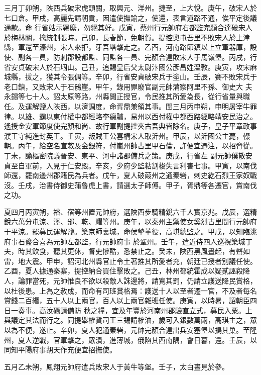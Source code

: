 \begin{pinyinscope}
 三月丁卯朔，陜西兵破宋虎頭關，取興元、洋州。捷至，上大悅。庚午，破宋人於七口倉。甲戌，高麗先請朝貢，因遣使撫諭之，使還，表言道路不通，俟平定後議通款。命
 行省姑示羈縻，勿絕其好。戊寅，蔡州行元帥府右都監完顏合達破宋人於梅林關，擒統制張時。己卯，長春節，免朝賀。提控奧屯吾里不敗宋人於上津縣，軍還至濠州，宋人來拒，牙吾塔擊走之。乙酉，河南路節鎮以上立軍器庫，設使、副各一員，防刺郡設都監、同監各一員、完顏合達敗宋人于馬嶺堡。丙戌，行省安貞破宋人於石堌山。己丑，追賜皇后父太尉汴國公彥昌姓溫敦。庚寅，攻宋麻城縣，拔之，獲其令張倜等。辛卯，行省安貞破宋兵于塗山。壬辰，賽不敗宋兵于老口鎮，又敗宋人于石鶻崖。甲午，錄用罪廢官副元帥蒲察阿里不孫、御史大
 夫永錫等七十人。詔太原等路，州縣闕正授官，令民推其所愛為長，從行省量與職任。及運解鹽人陜西，以濟調度，命胥鼎兼領其事。閏三月丙申朔，申明屠宰牛罪律。以雄、霸以東付權中都經略李瘸驢，易州以西付權中都西路經略靖安民治之。遙授金安軍節度使完顏和尚、故行軍副提控夾古吾典皆除名。庚子，皇子平章政事濮王守純進封英王。壬寅，叛賊王公喜構宋人取沂州。甲辰，以沂國公主薨，輟朝。丙午，給空名宣敕及金銀符，付嵐州帥古里甲石倫，許便宜遷注，以招脅從。丁未，諭樞密院議晉安、東平、河中諸郡備兵之策。庚戌，行省左
 副元帥僕散安貞至自軍前，入見于仁安殿。辛亥，少府少監粘割梭失言利害七事。甲寅，以南伐師還，罷南邊州郡籍民為兵者。戊午，夏人破葭州之通秦砦，刺史紇石烈王家奴戰沒。壬戌，治書侍御史蒲魯虎上書，請選太子師傅。甲子，胥鼎等各遷官，賞南伐之功。



 夏四月丙寅朔，裕、宿等州置元帥府，選陜西步騎精銳六千人實京兆。戊辰，選精銳六萬分屯涼、涇、邠、乾、耀等州。庚午，以秦州主禦使女奚烈古里間行元帥府于平涼。罷募民運解鹽。築京師裏城，命侯摯董役，高琪總監之。甲戌，以知臨洮府事石盞合喜為元帥左都監，行元帥府事
 於鞏州。壬午，遣近侍四人巡視築城丁夫，時其飲食，聽其更休，督吏慘酷，悉禁止之。癸未，陜西黑風晝起，有聲如雷，地大震。甲申，詔河北州縣官止令土著推其所愛者充，朝廷已授者別議任使。乙酉，夏人據通秦寨，提控納合買住擊敗之。己丑，林州都統霍成以疑貳誣殺降人，論罪當死，元帥惟良不欲以殺敵人誅邊將，請寬其罰，仍請立護送降民賞格，以杜後患。上為之赦成，而命有司班賞格焉：護送十人以至者遷一官，不及者每名賞錢二百緡，五十人以上兩官，百人以上兩官雜班任使。庚寅，以時暑，詔朝臣四日一奏事。高汝礪請備防
 秋之糧，宜及年豐於河南州郡驗直立式，募民入粟。上與議定其法而行之。同提舉榷貨司王三錫請榷油，歲可入銀數萬兩，高琪主之，眾以為不便，遂止。辛卯，夏人犯通秦砦，元帥完顏合達出兵安塞堡以搗其巢。至隆州，夏人逆戰，官軍擊之，眾潰，進薄城，俄陷其西南隅，會日暮，還。壬辰，以同知平陽府事胡天作充便宜招撫使。



 五月乙未朔，鳳翔元帥府遣兵敗宋人于黃牛等堡。壬子，太白晝見於參。




\end{pinyinscope}
